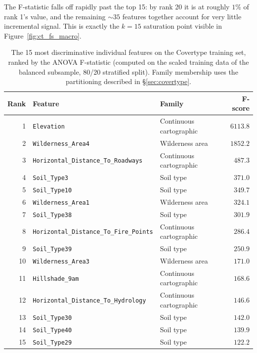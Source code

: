 \documentclass[11pt,a4paper]{article}
\begin{document}
The F-statistic falls off rapidly past the top 15: by rank 20 it is at
roughly $1\%$ of rank 1's value, and the remaining $\sim 35$ features
together account for very little incremental signal. This is exactly the
$k = 15$ saturation point visible in Figure~\ref{fig:ct_fs_macro}.

\begin{table}[H]
    \centering
    \caption{The 15 most discriminative individual features on the
    Covertype training set, ranked by the ANOVA F-statistic (computed on
    the scaled training data of the balanced subsample, 80/20 stratified
    split). Family membership uses the partitioning described in
    \S\ref{sec:covertype}.}
    \label{tab:ct_top_features}
    \begin{tabular}{rllr}
        \toprule
        Rank & Feature & Family & F-score \\
        \midrule
        1  & \texttt{Elevation}                          & Continuous cartographic & $6113.8$ \\
        2  & \texttt{Wilderness\_Area4}                  & Wilderness area         & $1852.2$ \\
        3  & \texttt{Horizontal\_Distance\_To\_Roadways} & Continuous cartographic & $487.3$  \\
        4  & \texttt{Soil\_Type3}                        & Soil type               & $371.0$  \\
        5  & \texttt{Soil\_Type10}                       & Soil type               & $349.7$  \\
        6  & \texttt{Wilderness\_Area1}                  & Wilderness area         & $324.1$  \\
        7  & \texttt{Soil\_Type38}                       & Soil type               & $301.9$  \\
        8  & \texttt{Horizontal\_Distance\_To\_Fire\_Points} & Continuous cartographic & $286.4$  \\
        9  & \texttt{Soil\_Type39}                       & Soil type               & $250.9$  \\
        10 & \texttt{Wilderness\_Area3}                  & Wilderness area         & $171.0$  \\
        11 & \texttt{Hillshade\_9am}                     & Continuous cartographic & $168.6$  \\
        12 & \texttt{Horizontal\_Distance\_To\_Hydrology} & Continuous cartographic & $146.6$  \\
        13 & \texttt{Soil\_Type30}                       & Soil type               & $142.0$  \\
        14 & \texttt{Soil\_Type40}                       & Soil type               & $139.9$  \\
        15 & \texttt{Soil\_Type29}                       & Soil type               & $122.2$  \\
        \bottomrule
    \end{tabular}
\end{table}
\end{document}

